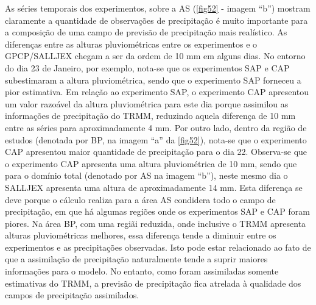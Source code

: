 As séries temporais dos experimentos, sobre a AS (\autoref{fig52} - imagem ``b'') mostram claramente a quantidade de observações de precipitação é muito importante para a composição de uma campo de previsão de precipitação mais realístico. As diferenças entre as alturas pluviométricas entre os experimentos e o GPCP/SALLJEX chegam a ser da ordem de 10 mm em alguns dias. No entorno do dia 23 de Janeiro, por exemplo, nota-se que os experimentos SAP e CAP subestimaram a altura pluviométrica, sendo que o experimento SAP forneceu a pior estimativa.  Em relação ao experimento SAP, o experimento CAP apresentou um valor razoável da altura pluviométrica para este dia porque assimilou as informações de precipitação do TRMM, reduzindo aquela diferença de 10 mm entre as séries para aproximadamente 4 mm. Por outro lado, dentro da região de estudos (denotada por BP, na imagem ``a'' da \autoref{fig52}), nota-se que o experimento CAP apresentou maior quantidade de precipitação para o dia 22. Observa-se que o experimento CAP apresenta uma altura pluviométrica de 10 mm, sendo que para o domínio total (denotado por AS na imagem ``b''), neste mesmo dia o SALLJEX apresenta uma altura de aproximadamente 14 mm. Esta diferença se deve porque o cálculo realiza para a área AS condidera todo o campo de precipitação, em que há algumas regiões onde os experimentos SAP e CAP foram piores. Na área BP, com uma regiãi reduzida, onde inclusive o TRMM apresenta alturas pluviométricas melhores, essa diferença tende a diminuir entre os experimentos e as precipitações observadas. Isto pode estar relacionado ao fato de que a assimilação de precipitação naturalmente tende a suprir maiores informações para o modelo. No entanto, como foram assimiladas somente estimativas do TRMM, a previsão de precipitação fica atrelada à qualidade dos campos de precipitação assimilados. 

